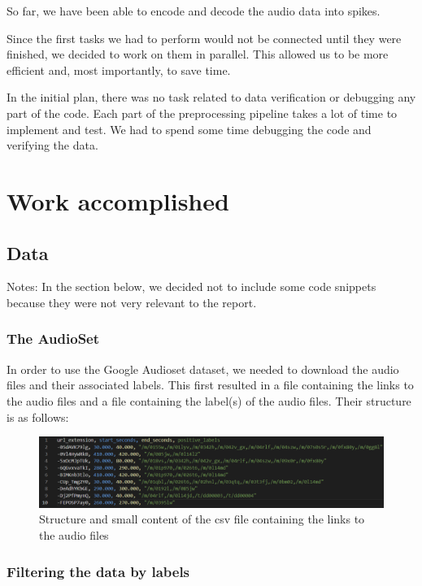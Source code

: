 \documentclass[11pt]{article}
\begin{document}
So far, we have been able to encode and decode the audio data into spikes.

Since the first tasks we had to perform would not be connected until they were finished, we decided to work on them in parallel. This allowed us to be more efficient and, most importantly, to save time.

In the initial plan, there was no task related to data verification or debugging any part of the code. Each part of the preprocessing pipeline takes a lot of time to implement and test. We had to spend some time debugging the code and verifying the data.

\section{Work accomplished}

\subsection{Data}

Notes: In the section below, we decided not to include some code snippets because they were not very relevant to the report.

\subsubsection{The AudioSet}

In order to use the Google Audioset dataset, we needed to download the audio files and their associated labels. This first resulted in a file containing the links to the audio files and a file containing the label(s) of the audio files.
Their structure is as follows:

\begin{figure}[h]
  \centering
  \includegraphics[width=\textwidth]{./image/structure_csv1.png}
  \caption{Structure and small content of the csv file containing the links to the audio files}
  \label{fig:structure_csv1}
\end{figure}

\subsubsection*{Filtering the data by labels}
\end{document}
